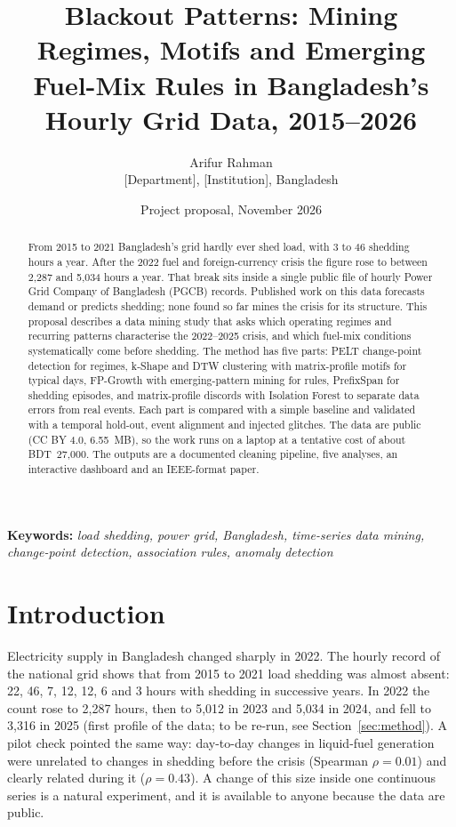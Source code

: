 \documentclass[10pt,a4paper]{article}
\begin{document}
\title{\Large\bfseries Blackout Patterns: Mining Regimes, Motifs and Emerging Fuel-Mix Rules in Bangladesh's Hourly Grid Data, 2015--2026}
\author{Arifur Rahman\\[2pt]\normalsize [Department], [Institution], Bangladesh}
\date{\normalsize Project proposal, November 2026}

\maketitle

\begin{abstract}
From 2015 to 2021 Bangladesh's grid hardly ever shed load, with 3 to 46 shedding hours a year. After the 2022 fuel and foreign-currency crisis the figure rose to between 2,287 and 5,034 hours a year. That break sits inside a single public file of hourly Power Grid Company of Bangladesh (PGCB) records. Published work on this data forecasts demand or predicts shedding; none found so far mines the crisis for its structure. This proposal describes a data mining study that asks which operating regimes and recurring patterns characterise the 2022--2025 crisis, and which fuel-mix conditions systematically come before shedding. The method has five parts: PELT change-point detection for regimes, k-Shape and DTW clustering with matrix-profile motifs for typical days, FP-Growth with emerging-pattern mining for rules, PrefixSpan for shedding episodes, and matrix-profile discords with Isolation Forest to separate data errors from real events. Each part is compared with a simple baseline and validated with a temporal hold-out, event alignment and injected glitches. The data are public (CC BY 4.0, 6.55~MB), so the work runs on a laptop at a tentative cost of about BDT~27{,}000. The outputs are a documented cleaning pipeline, five analyses, an interactive dashboard and an IEEE-format paper.
\end{abstract}

\noindent\textbf{Keywords:} \emph{load shedding, power grid, Bangladesh, time-series data mining, change-point detection, association rules, anomaly detection}

\section{Introduction}
Electricity supply in Bangladesh changed sharply in 2022. The hourly record of the national grid shows that from 2015 to 2021 load shedding was almost absent: 22, 46, 7, 12, 12, 6 and 3 hours with shedding in successive years. In 2022 the count rose to 2,287 hours, then to 5,012 in 2023 and 5,034 in 2024, and fell to 3,316 in 2025 (first profile of the data; to be re-run, see Section~\ref{sec:method}). A pilot check pointed the same way: day-to-day changes in liquid-fuel generation were unrelated to changes in shedding before the crisis (Spearman $\rho=0.01$) and clearly related during it ($\rho=0.43$). A change of this size inside one continuous series is a natural experiment, and it is available to anyone because the data are public.
\end{document}

